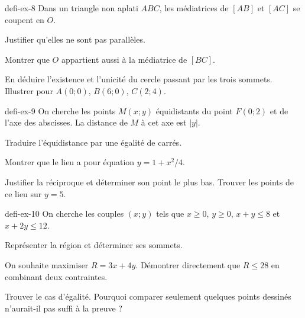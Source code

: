 \begin{blocEdition}{defi-ex-8}
Dans un triangle non aplati $ABC$, les médiatrices de $[AB]$ et $[AC]$ se coupent en $O$.\begin{questions}
\item Justifier qu’elles ne sont pas parallèles.
\item Montrer que $O$ appartient aussi à la médiatrice de $[BC]$.
\item En déduire l’existence et l’unicité du cercle passant par les trois sommets. Illustrer pour $A(0;0)$, $B(6;0)$, $C(2;4)$.
\end{questions}\label{fig-defi-ex-8}

\end{blocEdition}
\begin{blocEdition}{defi-ex-9}
On cherche les points $M(x;y)$ équidistants du point $F(0;2)$ et de l’axe des abscisses. La distance de $M$ à cet axe est $|y|$.\begin{questions}
\item Traduire l’équidistance par une égalité de carrés.
\item Montrer que le lieu a pour équation $y=1+x^2/4$.
\item Justifier la réciproque et déterminer son point le plus bas. Trouver les points de ce lieu sur $y=5$.
\end{questions}\label{fig-defi-ex-9}

\end{blocEdition}
\begin{blocEdition}{defi-ex-10}
On cherche les couples $(x;y)$ tels que $x\ge0$, $y\ge0$, $x+y\le8$ et $x+2y\le12$.\begin{questions}
\item Représenter la région et déterminer ses sommets.
\item On souhaite maximiser $R=3x+4y$. Démontrer directement que $R\le28$ en combinant deux contraintes.
\item Trouver le cas d’égalité. Pourquoi comparer seulement quelques points dessinés n’aurait-il pas suffi à la preuve ?
\end{questions}\label{fig-defi-ex-10}

\end{blocEdition}
